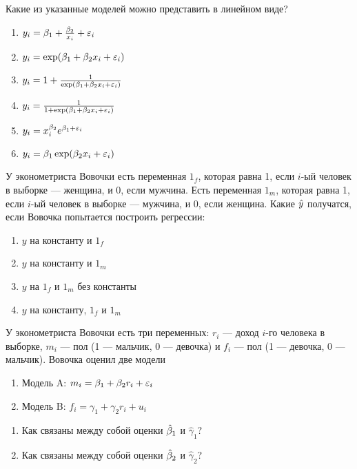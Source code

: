 \documentclass[pdftex,11pt,openany]{book}\usepackage[]{graphicx}\usepackage[]{color}
\begin{document}
\begin{problem}
 Какие из указанные моделей можно представить в линейном виде?
\begin{enumerate}
\item $y_i=\beta_1+\frac{\beta_2}{x_i}+\varepsilon_i$
\item $y_i=\exp(\beta_1+\beta_2 x_i+\varepsilon_i)$
\item $y_i=1+\frac{1}{\exp(\beta_1+\beta_2 x_i+\varepsilon_i)}$
\item $y_i=\frac{1}{1+\exp(\beta_1+\beta_2 x_i+\varepsilon_i)}$
\item $y_i=x_i^{\beta_2}e^{\beta_1+\varepsilon_i}$
\item $y_i=\beta_1\exp(\beta_2 x_i + \varepsilon_i)$
\end{enumerate}
\end{problem}

\begin{solution}
\newpage
\end{solution}



\begin{problem}
 У эконометриста Вовочки есть переменная $1_f$, которая равна 1, если $i$-ый человек в выборке --- женщина, и 0, если мужчина. Есть переменная $1_m$, которая равна 1, если $i$-ый человек в выборке --- мужчина, и 0, если женщина. Какие $\hat{y}$ получатся, если Вовочка попытается построить регрессии:
\begin{enumerate}
\item $y$ на константу и $1_f$
\item $y$ на константу и $1_m$
\item $y$ на $1_f$ и $1_m$ без константы
\item $y$ на константу, $1_f$ и $1_m$
\end{enumerate}
\end{problem}

\begin{solution}
\end{solution}
 


\begin{problem}
 У эконометриста Вовочки есть три переменных: $r_i$ --- доход $i$-го человека в выборке, $m_i$ --- пол (1 --- мальчик, 0 --- девочка) и $f_i$ --- пол (1 --- девочка, 0 --- мальчик). Вовочка оценил две модели
\begin{enumerate}
\item[] Модель A: $m_i=\beta_1+\beta_2 r_i+\varepsilon_i$
\item[] Модель B: $f_i=\gamma_1+\gamma_2 r_i+u_i$
\end{enumerate}
\begin{enumerate}
\item Как связаны между собой оценки $\hat{\beta}_1$ и $\hat{\gamma}_1$?
\item Как связаны между собой оценки $\hat{\beta}_2$ и $\hat{\gamma}_2$? 
\end{enumerate}
\end{problem}
\end{document}
